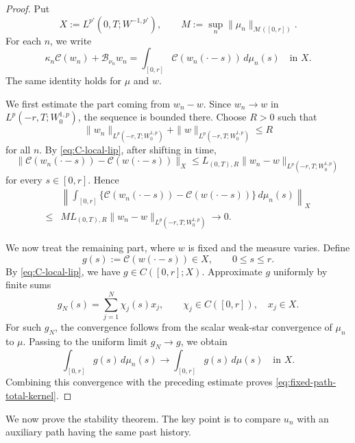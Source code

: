 \documentclass[a4paper,11pt,oneside,reqno]{amsart}
\newcounter{c}
\newcounter{d}
\newcounter{b}
\newcommand{\M}{\mathcal{M}}
\begin{document}
\begin{proof}
Put
\[
 X:=L^{p'}(0,T;W^{-1,p'}),
 \qquad
 M:=\sup_n\|\mu_n\|_{\M([0,r])}.
\]
For each \(n\), we write
\[
 \kappa_n\mathcal C(w_n)+\mathcal B_{\nu_n}w_n
 =
 \int_{[0,r]}\mathcal C(w_n(\cdot-s))\,d\mu_n(s)
 \quad\text{in }X.
\]
The same identity holds for \(\mu\) and \(w\).

We first estimate the part coming from \(w_n-w\). Since
\(w_n\to w\) in \(L^p(-r,T;W^{1,p}_0)\), the sequence is bounded there.
Choose \(R>0\) such that
\[
 \|w_n\|_{L^p(-r,T;W^{1,p}_0)}
 +\|w\|_{L^p(-r,T;W^{1,p}_0)}
 \le R
\]
for all \(n\). By \eqref{eq:C-local-lip}, after shifting in time,
\[
 \|\mathcal C(w_n(\cdot-s))-\mathcal C(w(\cdot-s))\|_X
 \le
 L_{(0,T),R}\|w_n-w\|_{L^p(-r,T;W^{1,p}_0)}
\]
for every \(s\in[0,r]\). Hence
\[
\begin{aligned}
&\left\|
 \int_{[0,r]}
 \{\mathcal C(w_n(\cdot-s))-\mathcal C(w(\cdot-s))\}
 \,d\mu_n(s)
\right\|_X \\
\le{}&
 M L_{(0,T),R}
 \|w_n-w\|_{L^p(-r,T;W^{1,p}_0)}
 \to0 .
\end{aligned}
\]

We now treat the remaining part, where \(w\) is fixed and the measure varies. Define
\[
 g(s):=\mathcal C(w(\cdot-s))\in X,
 \qquad 0\le s\le r .
\]
By \eqref{eq:C-local-lip}, we have \(g\in C([0,r];X)\). Approximate \(g\)
uniformly by finite sums
\[
 g_N(s)=\sum_{j=1}^N \chi_j(s)x_j,
 \qquad
 \chi_j\in C([0,r]),\quad x_j\in X .
\]
For such \(g_N\), the convergence follows from the scalar weak-star
convergence of \(\mu_n\) to \(\mu\). Passing to the uniform limit \(g_N\to g\), we obtain
\[
 \int_{[0,r]}g(s)\,d\mu_n(s)
 \to
 \int_{[0,r]}g(s)\,d\mu(s)
 \quad\text{in }X .
\]
Combining this convergence with the preceding estimate proves
\eqref{eq:fixed-path-total-kernel}. 
\end{proof}

We now prove the stability theorem. The key point is to compare \(u_n\) with
an auxiliary path having the same past history.
\end{document}
